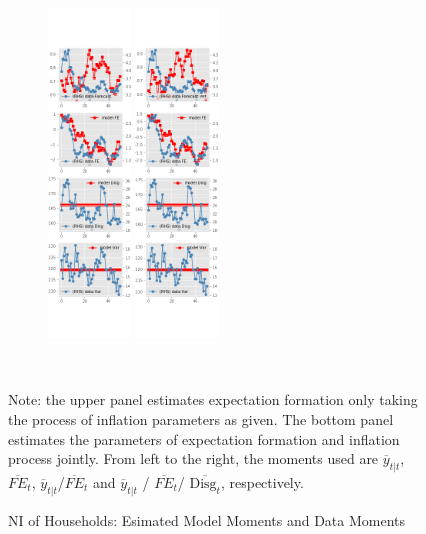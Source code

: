 \documentclass[]{article}
\begin{document}
\begin{figure}[ht]
\begin{subfigure}[b]{\textwidth}
		\includegraphics[width=0.24\textwidth]{figures/sce_ni_est_joint_diag2.png}
		\includegraphics[width=0.24\textwidth]{figures/sce_ni_est_joint_diag3.png}
	\end{subfigure}
	\\
	\begin{flushleft}
		{\footnotesize Note: the upper panel estimates expectation formation only taking the process of inflation parameters as given. The bottom panel estimates the parameters of expectation formation and inflation process jointly. From left to the right, the moments used are $\overline y_{t|t}$, $\overline{FE}_{t}$, $\overline y_{t|t}$/$\overline{FE}_{t}$ and $\overline y_{t|t}$ / $\overline{FE}_{t}$/ $\overline{\textrm{Disg}_t}$, respectively. }
	\end{flushleft}
	\caption{NI of Households: Esimated Model Moments and Data Moments}
\end{figure}
\end{document}
